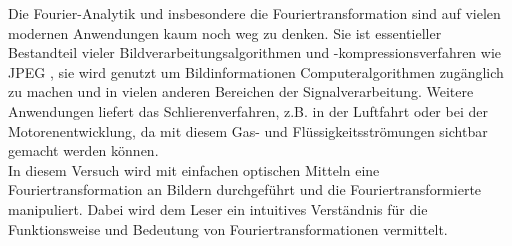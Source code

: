 
Die Fourier-Analytik und insbesondere die Fouriertransformation sind auf vielen modernen Anwendungen kaum noch weg zu denken. Sie ist essentieller Bestandteil vieler Bildverarbeitungsalgorithmen \cite{easton_fourier_2010} und -kompressionsverfahren wie JPEG \cite{_jpeg_2015}, sie wird genutzt um Bildinformationen Computeralgorithmen zugänglich zu machen \cite{prof._dr._norbert_link_vorlesungsscript:_????} und in vielen anderen Bereichen der Signalverarbeitung. Weitere Anwendungen liefert das Schlierenverfahren, z.B. in der Luftfahrt oder bei der Motorenentwicklung, da mit diesem Gas- und Flüssigkeitsströmungen sichtbar gemacht werden können.\\

In diesem Versuch wird mit einfachen optischen Mitteln eine Fouriertransformation an Bildern durchgeführt und die Fouriertransformierte manipuliert. Dabei wird dem Leser ein intuitives Verständnis für die Funktionsweise und Bedeutung von Fouriertransformationen vermittelt.